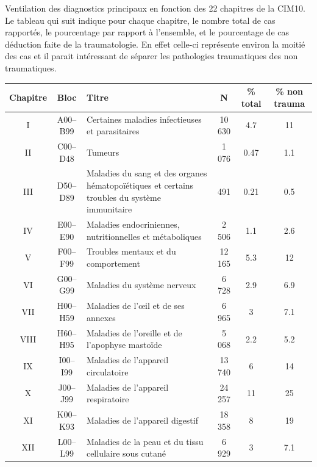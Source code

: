 \documentclass[12pt,english,french,twoside]{book}\usepackage[]{graphicx}\usepackage[]{color}
\begin{document}
Ventilation des diagnostics principaux en fonction des 22 chapitres de la CIM10. Le tableau qui suit indique pour chaque chapitre, le nombre total de cas rapportés, le pourcentage par rapport à l'ensemble, et le pourcentage de cas déduction faite de la traumatologie. En effet celle-ci représente environ la moitié des cas et il parait intéressant de séparer les pathologies traumatiques des non traumatiques.






\begin{longtable}{|c|c|m{4cm}|c|c|c|}
 \hline
 Chapitre & Bloc & Titre & N & \% total  & \% non trauma \\
 \hline
 
I & A00–B99 & Certaines maladies infectieuses et parasitaires & 10 630 & 4.7 & 11 \\
 II&C00–D48&Tumeurs&1 076&0.47&1.1\\
 
III&D50–D89&Maladies du sang et des organes hématopoïétiques et certains troubles du système immunitaire&491&0.21&0.5\\

IV&E00–E90&Maladies endocriniennes, nutritionnelles et métaboliques&2 506&1.1&2.6\\

V&F00–F99&Troubles mentaux et du comportement&12 165&5.3&12\\

VI&G00–G99&Maladies du système nerveux&6 728&2.9&6.9\\

VII & H00–H59 & Maladies de l’œil et de ses annexes & 6 965 & 3&7.1\\

VIII&H60–H95&Maladies de l'oreille et de l'apophyse mastoïde&5 068&2.2&5.2\\

IX&I00–I99&Maladies de l'appareil circulatoire&13 740&6&14\\

X&J00–J99&Maladies de l'appareil respiratoire&24 257&11&25\\

XI&K00–K93&Maladies de l'appareil digestif&18 358&8&19\\

XII&L00–L99&Maladies de la peau et du tissu cellulaire sous cutané&6 929&3&7.1\\


\end{longtable}
\end{document}

